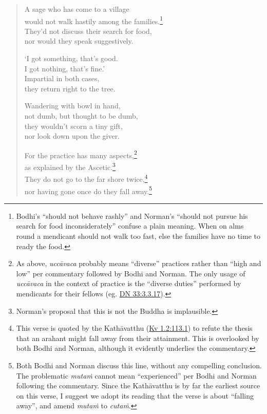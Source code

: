 \documentclass[12pt,openany]{book}%
\begin{document}
\begin{verse}
A sage who has come to a village \\
would not walk hastily among the families.\footnote{Bodhi’s “should not behave rashly” and Norman’s “should not pursue his search for food inconsiderately” confuse a plain meaning. When on alms round a mendicant should not walk too fast, else the families have no time to ready the food. } \\
They’d not discuss their search for food, \\
nor would they speak suggestively. 

‘I got something, that’s good. \\
I got nothing, that’s fine.’ \\
Impartial in both cases, \\
they return right to the tree. 

Wandering with bowl in hand, \\
not dumb, but thought to be dumb, \\
they wouldn’t scorn a tiny gift, \\
nor look down upon the giver. 

For the practice has many aspects,\footnote{As above, \textit{\textsanskrit{uccāvaca}} probably means “diverse” practices rather than “high and low” per commentary followed by Bodhi and Norman. The only usage of \textit{\textsanskrit{uccāvaca}} in the context of practice is the “diverse duties” performed by mendicants for their fellows (eg. \href{https://suttacentral.net/dn33/en/sujato\#3.3.17}{DN 33:3.3.17}). } \\
as explained by the Ascetic.\footnote{Norman’s proposal that this is not the Buddha is implausible. } \\
They do not go to the far shore twice,\footnote{This verse is quoted by the \textsanskrit{Kathāvatthu} (\href{https://suttacentral.net/kv1.2/en/sujato\#113.1}{Kv 1.2:113.1}) to refute the thesis that an arahant might fall away from their attainment. This is overlooked by both Bodhi and Norman, although it evidently underlies the commentary. } \\
nor having gone once do they fall away.\footnote{Both Bodhi and Norman discuss this line, without any compelling conclusion. The problematic \textit{\textsanskrit{mutaṁ}} cannot mean “experienced” per Bodhi and Norman following the commentary. Since the \textsanskrit{Kathāvatthu} is by far the earliest source on this verse, I suggest we adopt its reading that the verse is about “falling away”, and amend \textit{\textsanskrit{mutaṁ}} to \textit{\textsanskrit{cutaṁ}}. } 


\end{verse}
\end{document}
